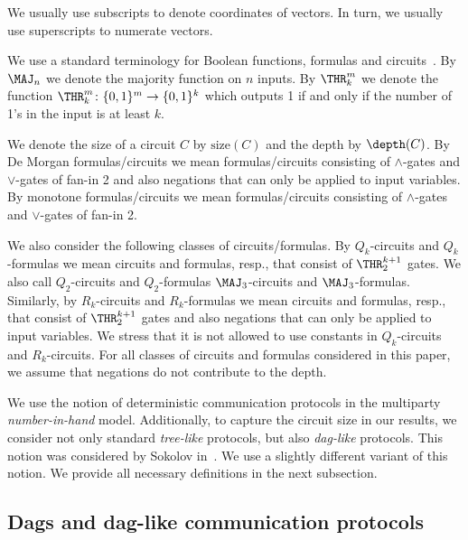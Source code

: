 We usually use subscripts to denote coordinates of vectors. In turn, we usually use superscripts to numerate vectors.

 We use a standard terminology for Boolean functions, formulas and circuits~\cite{Jukna}. By $\MAJ_n$ we denote the majority function on $n$ inputs. By $\THR^m_k$ we denote the function $\THR^m_k\colon\{0,1\}^m\to\{0,1\}^k$ which outputs 1 if and only if the number of 1's in the input is at least $k$.

We denote the size of a circuit $C$ by $\mathrm{size}(C)$ and the depth by $\depth(C)$. By De Morgan formulas/circuits we mean formulas/circuits consisting of $\land$-gates and $\lor$-gates of fan-in 2 and also negations that can only be applied to input variables. By monotone formulas/circuits we mean formulas/circuits consisting of $\land$-gates and $\lor$-gates of fan-in 2.

We also consider the following classes of circuits/formulas.
By $Q_k$-circuits %
and $Q_k$-formulas %
we mean circuits %
and formulas, resp.,  %
that consist of $\THR^{k + 1}_2$ gates. We also call $Q_2$-circuits and $Q_2$-formulas $\MAJ_3$-circuits and $\MAJ_3$-formulas.  Similarly, by $R_k$-circuits %
and $R_k$-formulas   %
we mean circuits %
and formulas, resp.,   %
%
that consist of $\THR^{k + 1}_2$ gates and also negations that can only be applied to input variables. We stress that it is not allowed to use constants in $Q_k$-circuits and $R_k$-circuits. For all classes of circuits and formulas considered in this paper, we assume that negations do not contribute to the depth.



We use the notion of deterministic communication protocols in the multiparty \emph{number-in-hand} model. Additionally, to capture the circuit size in our results, we consider not only standard \emph{tree-like} protocols, but also \emph{dag-like} protocols. This notion was considered by Sokolov in~\cite{Sok2017}. We use a  slightly different variant of this notion. We provide all necessary definitions in the next subsection.


\subsection{Dags and dag-like communication protocols}

